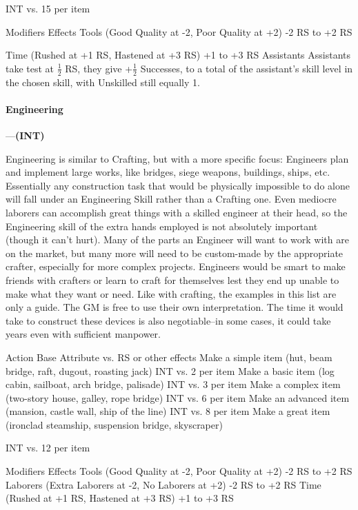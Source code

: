 \documentclass[oneside,11pt,english]{book}
\begin{document}
INT vs. 15 per item 

Modifiers Effects 
Tools (Good Quality at -2, Poor Quality at +2) -2 RS to +2 RS 


Time (Rushed at +1 RS, Hastened at +3 RS) +1 to +3 RS 
Assistants Assistants take test at $ \frac{1}{2} $ RS, they give +$ \frac{1}{2} $
Successes, to a total of the assistant’s skill level 
in the chosen skill, with Unskilled still equally 1. 


\paragraph{\label{skill:Engineering}Engineering}---\quad\textbf{(INT) }\par
Engineering is similar to Crafting, but with a more specific focus: Engineers plan and implement large works, like bridges, siege weapons, buildings, ships, etc. Essentially any construction task that would be physically impossible to do alone will fall under an Engineering Skill rather than a Crafting one. Even mediocre laborers can accomplish great things with a skilled engineer at their head, so the Engineering skill of the extra hands employed is not absolutely important (though it can’t hurt). Many of the parts an Engineer will want to work with are on the market, but many more will need to be custom-made by the appropriate crafter, especially for more complex projects. Engineers would be smart to make friends with crafters or learn to craft for themselves lest they end up unable to make what they want or need. Like with crafting, the examples in this list are only a guide. The GM is free to use their own interpretation. The time it would take to construct these devices is also negotiable--in some cases, it could take years even with sufficient manpower.


Action Base Attribute vs. RS or other 
effects 
Make a simple item (hut, beam bridge, raft, dugout, roasting jack) INT vs. 2 per item 
Make a basic item (log cabin, sailboat, arch bridge, palisade) INT vs. 3 per item 
Make a complex item (two-story house, galley, rope bridge) INT vs. 6 per item 
Make an advanced item (mansion, castle wall, ship of the line) INT vs. 8 per item 
Make a great item (ironclad steamship, suspension bridge, 
skyscraper) 

INT vs. 12 per item 

Modifiers Effects 
Tools (Good Quality at -2, Poor Quality at +2) -2 RS to +2 RS 
Laborers (Extra Laborers at -2, No Laborers at +2) -2 RS to +2 RS 
Time (Rushed at +1 RS, Hastened at +3 RS) +1 to +3 RS 
\end{document}
